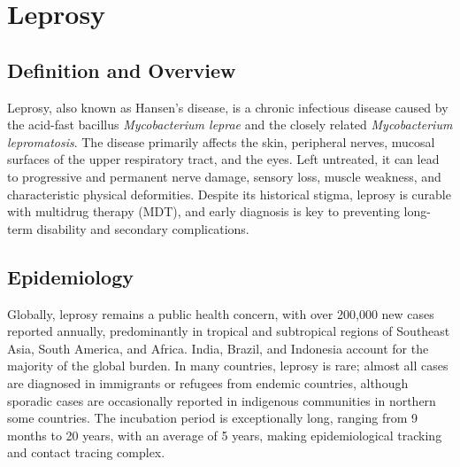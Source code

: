 \chapter{Leprosy}

\section*{Definition and Overview}
Leprosy, also known as Hansen's disease, is a chronic infectious disease caused by the acid-fast bacillus \textit{Mycobacterium leprae} and the closely related \textit{Mycobacterium lepromatosis}. The disease primarily affects the skin, peripheral nerves, mucosal surfaces of the upper respiratory tract, and the eyes. Left untreated, it can lead to progressive and permanent nerve damage, sensory loss, muscle weakness, and characteristic physical deformities. Despite its historical stigma, leprosy is curable with multidrug therapy (MDT), and early diagnosis is key to preventing long-term disability and secondary complications.

\section*{Epidemiology}
Globally, leprosy remains a public health concern, with over 200,000 new cases reported annually, predominantly in tropical and subtropical regions of Southeast Asia, South America, and Africa. India, Brazil, and Indonesia account for the majority of the global burden. In many countries, leprosy is rare; almost all cases are diagnosed in immigrants or refugees from endemic countries, although sporadic cases are occasionally reported in indigenous communities in northern some countries. The incubation period is exceptionally long, ranging from 9 months to 20 years, with an average of 5 years, making epidemiological tracking and contact tracing complex.


